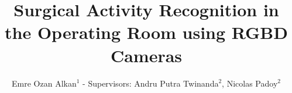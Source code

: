 \documentclass[final,hyperref={pdfpagelabels=false}]{beamer}
\title{\huge Surgical Activity Recognition in the Operating Room using RGBD Cameras} %
\author{Emre Ozan Alkan$^{1}$ - Supervisors: Andru Putra Twinanda$^{2}$, Nicolas Padoy$^{2}$} %
\institute{Masters in Computer Vision, University of Burgundy}
\begin{document}

\begin{frame}[t] %

\begin{columns}[t] %

\begin{column}{.02\textwidth}\end{column} %

\begin{column}{.465\textwidth} %




\end{column}
\end{columns}
\end{frame}
\end{document}
